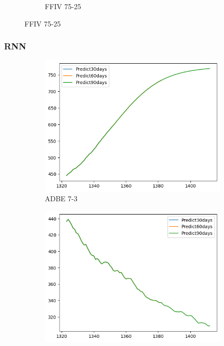 \documentclass{ieeeojies}
\begin{document}
\begin{figure}[H]
\begin{subfigure}[b]{0.33\linewidth}
        \caption{FFIV 75-25}
        \label{fig:ffiv-75-25}
    \end{subfigure}
\end{figure}
\subsubsection {RNN}
\begin{figure}[H]
    \centering
    \begin{subfigure}[b]{0.33\linewidth}
        \centering
        \includegraphics[width=\linewidth]{RNN Plot/RNN_ADBE_7_3_90.png}
        \caption{ADBE 7-3}
        \label{fig:adbe-7-3}
    \end{subfigure}%
    \hfill
    \begin{subfigure}[b]{0.33\linewidth}
        \centering
        \includegraphics[width=\linewidth]{RNN Plot/RNN_ADBE_8_2_90.png}

\end{subfigure}
\end{figure}
\end{document}

